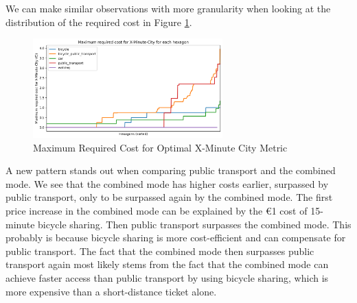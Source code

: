 We can make similar observations with more granularity when looking at the distribution of the required cost in Figure \ref{fig:maximum_required_cost_for_x_minute_city}.
\begin{figure}
  \begin{center}
    \includegraphics[width=0.65\textwidth]{Figures/results/cost/maximum_required_cost_for_x_minute_city}
  \end{center}
  \caption{Maximum Required Cost for Optimal X-Minute City Metric}
  \label{fig:maximum_required_cost_for_x_minute_city}
\end{figure}
A new pattern stands out when comparing public transport and the combined mode.
We see that the combined mode has higher costs earlier, surpassed by public transport, only to be surpassed again by the combined mode.
The first price increase in the combined mode can be explained by the \euro{1} cost of 15-minute bicycle sharing.
Then public transport surpasses the combined mode. 
This probably is because bicycle sharing is more cost-efficient and can compensate for public transport.
The fact that the combined mode then surpasses public transport again most likely stems from the fact that the combined mode can achieve faster access than public transport by using bicycle sharing, which is more expensive than a short-distance ticket alone.

